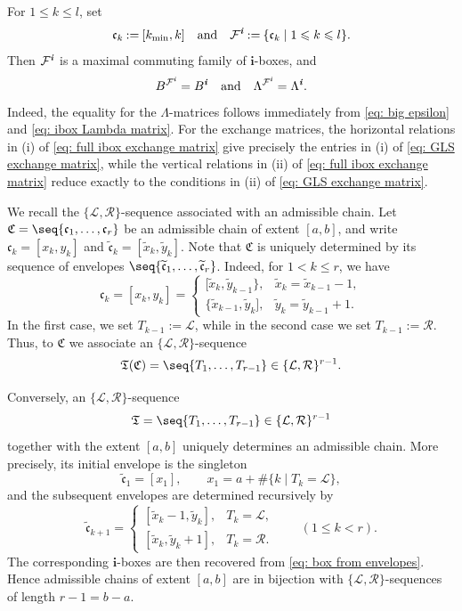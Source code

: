 \documentclass[12pt, leqno]{amsart}
\numberwithin{equation}{section}
\theoremstyle{plain}
\theoremstyle{definition}
\renewcommand{\le}{\leqslant}
\newcommand{\seteq}{\mathbin{:=}}
\newcommand{\ii}{ \textbf{\textit{i}}}
\newcommand{\tx}{\widetilde{x}}
\newcommand{\ty}{\widetilde{y}}
\newcommand{\frakC}{\mathfrak{C}}
\newcommand{\frakT}{\mathfrak{T}}
\newcommand{\frakc}{\mathfrak{c}}
\newcommand{\tfrakc}{\widetilde{\frakc}}
\newcommand{\bfi}{\mathbf{i}}
\newcommand{\calF}{\mathcal{F}}
\newcommand{\calL}{\mathcal{L}}
\newcommand{\calR}{\mathcal{R}}
\newcommand{\qtq}[1][{and}]{\quad\text{{#1}}\quad}
\begin{document}
For $1\le k\le l$, set
\[
\frakc_k\seteq[k_{\min},k] \qtq \calF^\ii\seteq\{\frakc_k\mid 1\le k\le l\}.
\]
Then $\calF^\ii$ is a maximal commuting family of $\bfi$-boxes, and
\[
B^{\calF^\ii}=B^\ii \qtq \Lambda^{\calF^\ii}=\Lambda^\ii.
\]
Indeed, the equality for the $\Lambda$-matrices follows immediately
from \eqref{eq: big epsilon} and \eqref{eq: ibox Lambda matrix}.
For the exchange matrices, the horizontal relations in {\rm (i)} of
\eqref{eq: full ibox exchange matrix} give precisely the entries in
{\rm (i)} of \eqref{eq: GLS exchange matrix}, while the vertical
relations in {\rm (ii)} of \eqref{eq: full ibox exchange matrix}
reduce exactly to the conditions in {\rm (ii)} of
\eqref{eq: GLS exchange matrix}.

We recall the $\{\calL,\calR\}$-sequence associated with an admissible
chain. Let $\frakC=\seq{\frakc_1,\ldots,\frakc_r}$
be an admissible chain of extent $[a,b]$, and write
$\frakc_k=[x_k,y_k]$ and $\tfrakc_k=[\tx_k,\ty_k]$.
Note that $\frakC$ is uniquely determined by its sequence of envelopes
$\seq{\tfrakc_1,\ldots,\tfrakc_r}$. Indeed, for $1<k\le r$, we have
\begin{equation}\label{eq: box from envelopes}
\frakc_k=[x_k,y_k] =
\begin{cases}
[\tx_k,\ty_{k-1}\}, & \tx_k=\tx_{k-1}-1,\\
\{\tx_{k-1},\ty_k], & \ty_k=\ty_{k-1}+1.
\end{cases}
\end{equation}
In the first case, we set $T_{k-1}\seteq \calL$, while in the second case we set
$T_{k-1}\seteq  \calR$. Thus, to $\frakC$ we associate an $\{\calL,\calR\}$-sequence
\[
\frakT(\frakC)=\seq{T_1,\ldots,T_{r-1}}\in\{\calL,\calR\}^{r-1}.
\]

Conversely, an $\{\calL,\calR\}$-sequence
\[
\frakT=\seq{T_1,\ldots,T_{r-1}}\in\{\calL,\calR\}^{r-1}
\]
together with the extent $[a,b]$ uniquely determines an admissible
chain. More precisely, its initial envelope is the singleton
\[
\tfrakc_1=[x_1],
\qquad
x_1=a+\#\{k\mid T_k=\calL\},
\]
and the subsequent envelopes are determined recursively by
\[
\tfrakc_{k+1} =
\begin{cases}
[\tx_k-1,\ty_k], & T_k=\calL,\\[1mm]
[\tx_k,\ty_k+1], & T_k=\calR.
\end{cases}
\qquad(1\le k<r).
\]
The corresponding $\bfi$-boxes are then recovered from
\eqref{eq: box from envelopes}.
Hence admissible chains of extent $[a,b]$ are in bijection with
$\{\calL,\calR\}$-sequences of length $r-1=b-a$.
\end{document}
